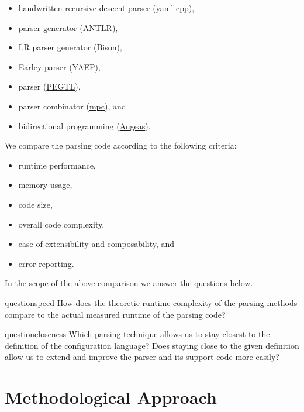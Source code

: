 \begin{itemize}
  \item handwritten recursive descent parser (\href{https://github.com/jbeder/yaml-cpp}{yaml-cpp}),
  \item {} parser generator (\href{http://www.antlr.org}{ANTLR}),
  \item LR parser generator (\href{https://www.gnu.org/software/bison}{Bison}),
  \item Earley parser (\href{https://github.com/vnmakarov/yaep}{YAEP}),
  \item {} parser (\href{https://github.com/taocpp/PEGTL}{PEGTL}),
  \item parser combinator (\href{https://github.com/orangeduck/mpc}{mpc}), and
  \item bidirectional programming (\href{http://augeas.net}{Augeas}).
\end{itemize}

We compare the parsing code according to the following criteria:

\begin{itemize}
  \item runtime performance,
  \item memory usage,
  \item code size,
  \item overall code complexity,
  \item ease of extensibility and composability, and
  \item error reporting.
\end{itemize}

In the scope of the above comparison we answer the questions below.

\begin{restatable}{question}{speed}
  \label{que:speed}
  How does the theoretic runtime complexity of the parsing methods compare to the actual measured runtime of the parsing code?
\end{restatable}

\begin{restatable}{question}{closeness}
  \label{que:closeness}
  Which parsing technique allows us to stay closest to the definition of the configuration language? Does staying close to the given definition
  allow us to extend and improve the parser and its support code more easily?
\end{restatable}

\section{Methodological Approach}


